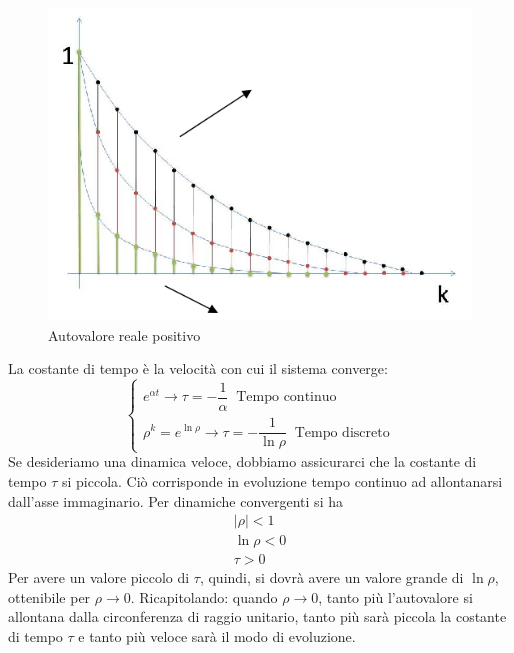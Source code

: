 \documentclass[a4paper]{report}
\begin{document}
\begin{figure}[!h]
  \begin{center}
    \includegraphics[scale=0.4]{./figures/autovaloreRealePositivo02.png}
    \caption{Autovalore reale positivo}\label{fig:autovaloreRealePositivo02}
  \end{center}
\end{figure}
La costante di tempo \`e la velocit\`a con cui il sistema
converge:
\[\left\{
\begin{array}{l}
  e^{\alpha t} \to \tau = - \dfrac{1}{\alpha} \;\;\textrm{Tempo
    continuo}\\
  \rho^k = e^{\ln \rho} \to \tau = - \dfrac{1}{\ln \rho}
  \;\;\textrm{Tempo discreto}
\end{array}
\right.
\]
Se desideriamo una dinamica veloce, dobbiamo assicurarci che la
costante di tempo $\tau$ si piccola. Ci\`o corrisponde in
evoluzione tempo continuo ad allontanarsi dall'asse
immaginario. Per dinamiche convergenti si ha
\[
\begin{array}{l}
  |\rho| < 1\\
  \ln \rho < 0\\
  \tau > 0
\end{array}
\]
Per avere un valore piccolo di $\tau$, quindi, si dovr\`a avere
un valore grande di $\ln \rho$, ottenibile per $\rho \to
0$. Ricapitolando: quando $\rho \to 0$, tanto pi\`u l'autovalore
si allontana dalla circonferenza di raggio unitario, tanto pi\`u
sar\`a piccola la costante di tempo $\tau$ e tanto pi\`u veloce
sar\`a il modo di evoluzione.
\end{document}
